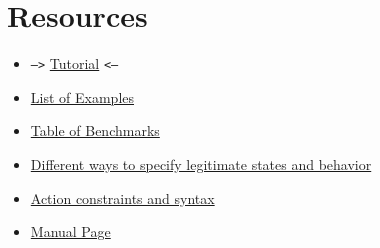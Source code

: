 
\section{Resources}
\begin{itemize}
\item  \texttt{-->} \href{tut.html}{Tutorial} \texttt{<--}
\item \href{example/index.html}{List of Examples}
\item \href{benchmark.html}{Table of Benchmarks}
\item \href{legit.html}{Different ways to specify legitimate states and behavior}
\item \href{permit.html}{Action constraints and syntax}
\item \href{man.html}{Manual Page}
\end{itemize}





